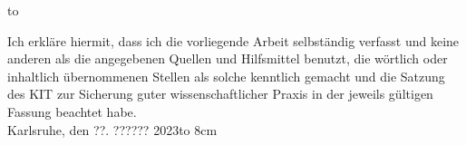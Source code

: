 \thispagestyle{empty}
\vspace*{32\baselineskip}
\hbox to \textwidth{\hrulefill}
\par
Ich erkläre hiermit, dass ich die vorliegende Arbeit selbständig verfasst und
keine anderen als die angegebenen Quellen und Hilfsmittel benutzt, 
die wörtlich oder inhaltlich übernommenen Stellen als solche kenntlich 
gemacht und die Satzung des KIT zur Sicherung guter wissenschaftlicher 
Praxis in der jeweils gültigen Fassung beachtet habe.
\vspace*{2cm}
\\Karlsruhe, den ??. ?????? 2023\hfill \hbox to 8cm{\hrulefill}

\clearpage






